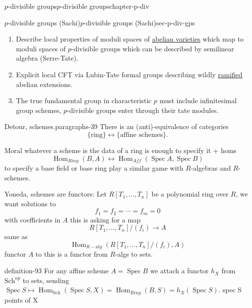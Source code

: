 \documentclass[oneside,10pt,]{book}
\numberwithin{equation}{section}
\newcommand{\lb}{[}
\newcommand{\rb}{]}
\newcommand{\op}{\mathrm{op}}
\DeclareMathOperator{\Hom}{Hom}
\DeclareMathOperator{\Spec}{Spec}
\begin{document}
\begin{chapterptx}{\(p\)-divisible groups}{}{\(p\)-divisible groups}{}{}{chapter-p-div}
\begin{sectionptx}{\(p\)-divisible groups (Sachi)}{}{\(p\)-divisible groups (Sachi)}{}{}{sec-p-div-gps}
\begin{enumerate}
\item\hypertarget{li-253}{}Describe local properties of moduli spaces of \hyperref[def-buntes-abvar]{abelian varieties} which map to moduli spaces of \(p\)-divisible groups which can be described by semilinear algebra (Serre-Tate).%
\item\hypertarget{li-254}{}Explicit local CFT via Lubin-Tate formal groups describing wildly \hyperref[def-dess-ramified]{ramified} abelian extensions.%
\item\hypertarget{li-255}{}The true fundamental group in characteristic \(p\) must include infinitesimal group schemes, \(p\)-divisible groups enter through their tate modules.%
\end{enumerate}
%
\begin{paragraphs}{Detour, schemes.}{paragraphs-39}%
\hypertarget{p-988}{}%
There is an (anti)-equivalence of categories%
\begin{equation*}
\{\text{ring}\} \leftrightarrow\{\text{affine schemes}\}\text{.}
\end{equation*}
%
\par
\hypertarget{p-989}{}%
Moral whatever  a scheme is the data of a ring is enough to specify it + homs%
\begin{equation*}
\Hom_{Ring} (B,A) \leftrightarrow \Hom_{Aff}(\Spec A, \Spec B)
\end{equation*}
to specify a base field or base ring play a similar game with \(R\)-algebras and \(R\)-schemes.%
\par
\hypertarget{p-990}{}%
Yoneda, schemes are functors: Let \(R\lb T_1,\ldots,T_n\rb \) be a polynomial ring over \(R\), we want solutions to%
\begin{equation*}
f_1=  f_2 = \cdots = f_m = 0
\end{equation*}
with coefficients in \(A\) this is asking for  a map%
\begin{equation*}
R\lb T_1, \ldots ,T_n] /(f_i) \to A
\end{equation*}
same as%
\begin{equation*}
\Hom_{R-alg} (R[T_1,\ldots, T_n] /(f_i), A)
\end{equation*}
functor \(A\) to this is a functor from \(R\)-algs to sets.%
\begin{definition}{}{definition-93}%
\hypertarget{p-991}{}%
For any affine scheme \(A = \Spec B\) we attach a functor \(h_X\) from \(\mathrm{Sch}^\op\) to sets, sending \(\Spec S \mapsto \Hom_{\mathrm{Sch}} (\Spec S, X) = \Hom_{Ring} (B,S) = h_X(\Spec S)\). spec S points of X%
\end{definition}

\end{paragraphs}
\end{sectionptx}
\end{chapterptx}
\end{document}

